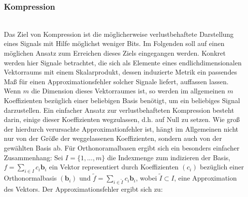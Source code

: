 \subsubsection{Kompression}~\\
%
Das Ziel von Kompression ist die möglicherweise verlustbehaftete Darstellung eines Signals mit Hilfe möglichst weniger Bits. Im Folgenden soll auf einen möglichen Ansatz zum Erreichen dieses Ziels eingegangen werden.
Konkret werden hier Signale betrachtet, die sich als Elemente eines endlichdimensionalen Vektorraums mit einem Skalarprodukt, dessen induzierte Metrik ein passendes Maß für einen Approximationsfehler solcher Signale liefert, auffassen lassen. Wenn $m$ die Dimension dieses Vektorraumes ist, so werden im allgemeinen $m$ Koeffizienten bezüglich einer beliebigen Basis benötigt, um ein beliebiges Signal darzustellen. Ein einfacher Ansatz zur verlustbehafteten Kompression besteht darin, einige dieser Koeffizienten wegzulassen, d.h. auf Null zu setzen. Wie groß der hierdurch verursachte Approximationfehler ist, hängt im Allgemeinen nicht nur von der Größe der weggelassenen Koeffizienten, sondern auch von der gewählten Basis ab. Für Orthonoramalbasen ergibt sich ein besonders einfacher Zusammenhang: Sei $I=\{1,...,m\}$ die Indexmenge zum indizieren der Basis, $f=\sum_{i \in I} c_i \mathbf{b}_i$ ein Vektor representiert durch Koeffizienten $(c_i)$ bezüglich einer Orthonormalbasis $(\mathbf{b}_i)$ und $\tilde{f}=\sum_{i \in \tilde{I}} c_i \mathbf{b}_i$, wobei $\tilde{I} \subset I$, eine Approximation des Vektors. Der Approximationsfehler ergibt sich zu:
